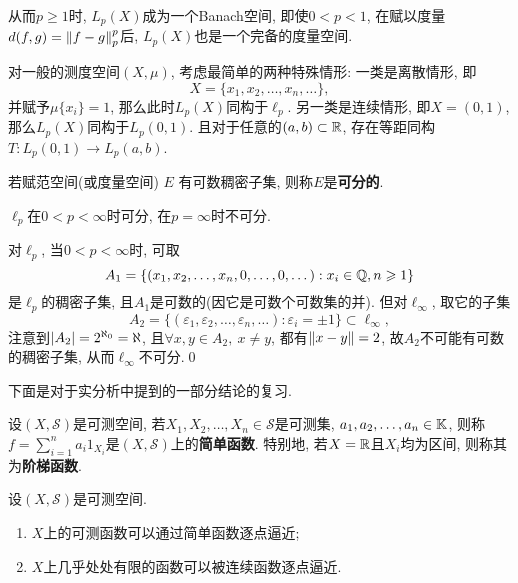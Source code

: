 从而$ p\geqslant 1 $时, $ L_p(X) $成为一个Banach空间, 即使$ 0<p<1 $, 在赋以度量$ d(f,g)=\left\| f-g \right\|_p^p $后, $ L_p(X) $也是一个完备的度量空间.

对一般的测度空间$ (X,\mu) $, 考虑最简单的两种特殊情形: 一类是离散情形, 即
\[
	X=\{ x_1,x_2, \dots,x_n, \dots \},
\]
并赋予$ \mu\{x_i\}=1 $, 那么此时$ L_p(X) $同构于$ \ell_p $. 另一类是连续情形, 即$ X=(0,1) $, 那么$ L_p(X) $同构于$ L_p(0,1) $. 且对于任意的$ (a,b)\subset\mathbb{R} $, 存在等距同构$ T : L_p(0,1)\to L_p(a,b) $.

\begin{Definition}[可分性]
	若赋范空间(或度量空间) $ E $ 有可数稠密子集, 则称$ E $是\textbf{可分的}.
\end{Definition}

\begin{Proposition}
	$ \ell_p $在$ 0<p<\infty $时可分, 在$ p=\infty $时不可分.
\end{Proposition}
\begin{Proof}
	对$ \ell_p $, 当$ 0<p<\infty $时, 可取
	\[
		A_1=\{ (x_1,x_2, \dots,x_n,0, \dots,0, \dots) : x_i\in\mathbb{Q}, n\geqslant 1 \}
	\]
	是$ \ell_p $的稠密子集, 且$ A_1 $是可数的(因它是可数个可数集的并). 但对$ \ell_\infty $, 取它的子集
	\[
		A_2=\{ (\varepsilon_1,\varepsilon_2, \dots,\varepsilon_n, \dots) : \varepsilon_i=\pm 1 \}\subset\ell_\infty,
	\]
	注意到$ \left| A_2 \right| =2^{\aleph_0}=\aleph $, 且$ \forall x,y\in A_2,\ x\ne y $, 都有$ \left\| x-y \right\|=2 $, 故$ A_2 $不可能有可数的稠密子集, 从而$ \ell_\infty $不可分.\qed
\end{Proof}

下面是对于实分析中提到的一部分结论的复习.

\begin{Definition}[简单函数]
	设$ (X,\mathcal S) $是可测空间, 若$ X_1,X_2, \dots,X_n\in\mathcal S $是可测集, $ a_1,a_2, \dots,a_n\in\mathbb{K} $, 则称$ f=\sum\limits_{i=1}^na_i1_{X_i} $是$ (X,\mathcal S) $上的\textbf{简单函数}. 特别地, 若$ X=\mathbb{R} $且$ X_i $均为区间, 则称其为\textbf{阶梯函数}.
\end{Definition}

\begin{Proposition}
	设$ (X,\mathcal S) $是可测空间.
	\begin{enumerate}[(1)]
		\item $ X $上的可测函数可以通过简单函数逐点逼近;
		\item $ X $上几乎处处有限的函数可以被连续函数逐点逼近.
	\end{enumerate}
\end{Proposition}

